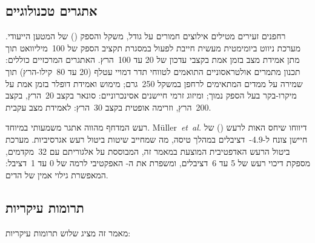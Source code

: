 \subsection{אתגרים טכנולוגיים}
\label{sec:challenges}

רחפנים זעירים מטילים אילוצים חמורים על גודל, משקל והספק () של המטען הייעודי. מערכת ניווט ביומימטית מעשית חייבת לפעול במסגרת תקציב הספק של 100~מיליוואט תוך מתן אמידת מצב בזמן אמת בקצבי עדכון של 20 עד 100~הרץ. האתגרים המרכזיים כוללים: תכנון מתמרים אולטראסוניים התואמים לטווחי תדר דמויי עטלף (20 עד 80~קילו-הרץ) תוך שמירה על ממדים המתאימים לרחפן במשקל 250~גרם; מימוש  ואמידת דופלר בזמן אמת על מיקרו-בקר בעל הספק נמוך; ומיזוג זרמי חיישנים אסינכרוניים: סונאר בקצב 20~הרץ,  בקצב 200~הרץ, וזרימה אופטית בקצב 30~הרץ: לאמידת מצב עקבית.

רעש המדחף מהווה אתגר משמעותי במיוחד. Müller~\textit{et~al.} דיווחו שיחס האות לרעש () של חיישן  צונח ל-4.9-~דציבלים במהלך טיסה, מה שמחייב שיטות ביטול רעש אגרסיביות. מערכת ביטול הרעש האדפטיבית המוצעת במאמר זה, המבוססת על אלגוריתם  עם 32~מקדמים, מספקת דיכוי רעש של 5 עד 6~דציבלים, ומשפרת את ה- האפקטיבי לרמה של 0 עד 1~דציבל: המאפשרת גילוי אמין של הדים.

\begin{table}[htbp]
\centering
\caption{השוואה בין מערכות ניווט ביומימטיות קיימות לבין הגישה המוצעת. (Comparison of existing bio-inspired navigation systems vs. proposed approach.)}
\label{tab:ch01_comparison}
\end{table}

\subsection{תרומות עיקריות}
\label{sec:contributions}

מאמר זה מציג שלוש תרומות עיקריות:

